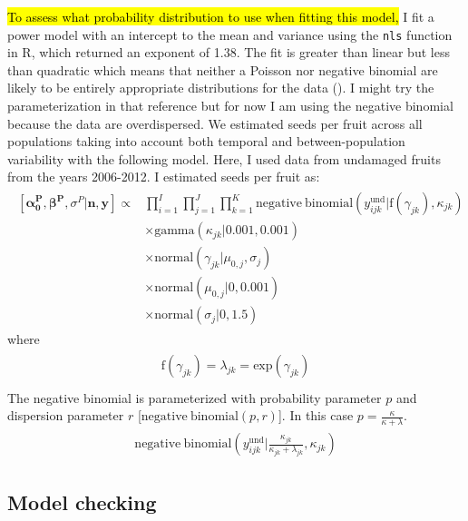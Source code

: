 \documentclass[12pt, oneside, titlepage]{article}   	%
\begin{document}
\hl{To assess what probability distribution to use when fitting this model,} I fit a power model with an intercept to the mean and variance using the \verb|nls| function in R, which returned an exponent of 1.38. The fit is greater than linear but less than quadratic which means that neither a Poisson nor negative binomial are likely to be entirely appropriate distributions for the data (\cite{linden2011}). I might try the parameterization in that reference but for now I am using the negative binomial because the data are overdispersed. We estimated seeds per fruit across all populations taking into account both temporal and between-population variability with the following model. Here, I used data from undamaged fruits from the years 2006-2012. I estimated seeds per fruit as:
%
\begin{align}
  \begin{split}
 [ \bm{\alpha^P_0}, \bm{\beta^P}, \sigma^P | \bm{n}, \bm{y} ] \propto 
 & \prod_{i=1}^{I} \prod_{j=1}^{J} \prod_{k=1}^{K}  \mathrm{negative \ binomial} ( y^{\mathrm{und}}_{ijk} | \mathrm{f} ( \gamma_{jk} ),  \kappa_{jk} ) 
     \\ & \times \mathrm{gamma} ( \kappa_{jk} | 0.001 , 0.001 ) 
     \\ & \times \mathrm{normal} ( \gamma_{jk} | \mu_{0,j} , \sigma_j) 
    \\ & \times \mathrm{normal} ( \mu_{0,j} | 0, 0.001 ) 
    \\ & \times \mathrm{normal} ( \sigma_j | 0, 1.5 )  
   \end{split}
\end{align}
%
where
%
\begin{align}
  \begin{split}
\mathrm{f} ( \gamma_{jk} ) = \lambda_{jk} = \mathrm{exp}(  \gamma_{jk} ) \\
  \end{split}
\end{align}
%
The negative binomial is parameterized with probability parameter $p$ and dispersion parameter $r$ [$ \mathrm{negative \ binomial}(p,r)$]. In this case $p=\frac{\kappa}{\kappa+\lambda}$.
%
\begin{align}
  \begin{split}
  \mathrm{negative \ binomial} ( y^{\mathrm{und}}_{ijk} | \frac{\kappa_{jk}}{\kappa_{jk} + \lambda_{jk}} ,  \kappa_{jk} )
  \end{split}
\end{align}

\subsection*{Model checking}
\end{document}
